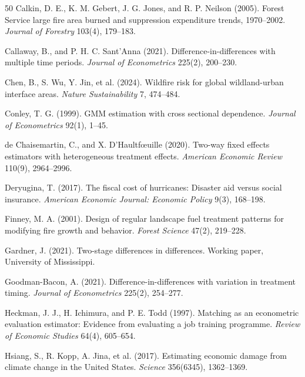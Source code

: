 \documentclass[12pt, letterpaper]{article}
\begin{document}
\begin{thebibliography}{50}
Calkin, D. E., K. M. Gebert, J. G. Jones, and R. P. Neilson (2005). Forest Service large fire area burned and suppression expenditure trends, 1970--2002. \textit{Journal of Forestry} 103(4), 179--183.

Callaway, B., and P. H. C. Sant'Anna (2021). Difference-in-differences with multiple time periods. \textit{Journal of Econometrics} 225(2), 200--230.

Chen, B., S. Wu, Y. Jin, et al. (2024). Wildfire risk for global wildland-urban interface areas. \textit{Nature Sustainability} 7, 474--484.

Conley, T. G. (1999). GMM estimation with cross sectional dependence. \textit{Journal of Econometrics} 92(1), 1--45.

de Chaisemartin, C., and X. D'Haultf{\oe}uille (2020). Two-way fixed effects estimators with heterogeneous treatment effects. \textit{American Economic Review} 110(9), 2964--2996.

Deryugina, T. (2017). The fiscal cost of hurricanes: Disaster aid versus social insurance. \textit{American Economic Journal: Economic Policy} 9(3), 168--198.

Finney, M. A. (2001). Design of regular landscape fuel treatment patterns for modifying fire growth and behavior. \textit{Forest Science} 47(2), 219--228.

Gardner, J. (2021). Two-stage differences in differences. Working paper, University of Mississippi.

Goodman-Bacon, A. (2021). Difference-in-differences with variation in treatment timing. \textit{Journal of Econometrics} 225(2), 254--277.

Heckman, J. J., H. Ichimura, and P. E. Todd (1997). Matching as an econometric evaluation estimator: Evidence from evaluating a job training programme. \textit{Review of Economic Studies} 64(4), 605--654.

Hsiang, S., R. Kopp, A. Jina, et al. (2017). Estimating economic damage from climate change in the United States. \textit{Science} 356(6345), 1362--1369.


\end{thebibliography}
\end{document}
